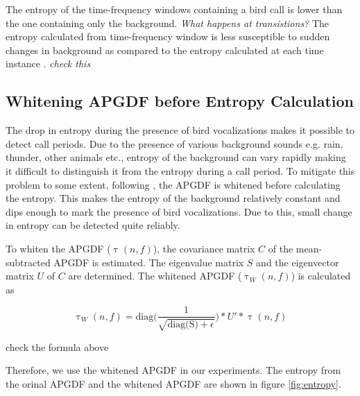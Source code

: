 \documentclass[a4paper]{article}
\begin{document}
The entropy of the time-frequency windows containing a bird call is lower than the
one containing only the background. \textit{What happens at transistions?}
The entropy calculated from time-frequency
window is less susceptible to sudden changes in background as compared to the
entropy calculated at each time instance \cite{wang2013}.
\textit{check this}




 


\subsection{Whitening APGDF before Entropy Calculation}

The drop in entropy during the presence of bird vocalizations makes it possible
to detect call periods. Due to the presence of various background sounds e.g.
rain, thunder, other animals etc., entropy of the background can  vary rapidly
making it difficult to distinguish it from the entropy during a call period. To mitigate
this problem to some extent, following \cite{wang2013}, the APGDF is whitened 
before calculating the
entropy. This makes the entropy of the background relatively constant and dips
enough to mark the presence of bird vocalizations. Due to this, small change in entropy 
can be detected quite reliably.

To whiten the APGDF ($\uptau(n,f)$), the covariance matrix $C$ of the mean-subtracted
APGDF is estimated. The eigenvalue matrix $S$ and the eigenvector matrix
$U$ of $C$ are determined. The whitened APGDF
($\uptau_W(n,f)$) is calculated as

\begin{equation}
\uptau_W(n,f)=\text{diag} \bigg(  \frac{1}{\sqrt{\text{diag(S)}+\epsilon}} \bigg )*U'*\uptau(n,f)
\end{equation}

check the formula above

Therefore, we use the whitened APGDF in our experiments. The entropy from the
orinal APGDF and the whitened APGDF are shown in figure \ref{fig:entropy}.
\end{document}
